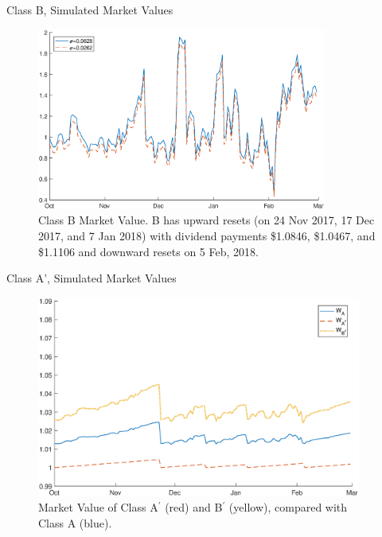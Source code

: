\documentclass[notes=show, beamer, handout]{beamer}
\begin{document}
\begin{frame}{Class B, Simulated Market Values}


\begin{figure}[htb]
\begin{centering}
\includegraphics[width=0.85\textwidth]{WB}
\par\end{centering}
\caption{Class B Market Value. B has upward resets (on 24 Nov 2017, 17 Dec 2017, and 7 Jan 2018) with dividend payments \$1.0846, \$1.0467, and \$1.1106 and downward resets on 5 Feb, 2018. }
\label{fig:valB}
\end{figure}
\end{frame}


\begin{frame}{Class A', Simulated Market Values}



\begin{figure}[htb]
\centering
\includegraphics[width=0.95\textwidth]{WABpnoCI4.eps}
\caption{Market Value of Class A$^\prime$ (red) and B$^\prime$ (yellow), compared with Class A (blue).}
\label{fig:valAPrime}
\end{figure}

\end{frame}
\end{document}
